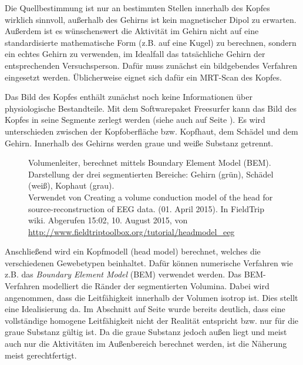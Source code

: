 \documentclass[doc,a4paper,12pt]{apa6}
\makeatletter
\DeclareRobustCommand*{\nameref}[1]{%
      \glqq{\myorg@nameref{#1}}\grqq%
    }%
\makeatother
\begin{document}
Die Quellbestimmung ist nur an bestimmten Stellen innerhalb des Kopfes wirklich sinnvoll, außerhalb des Gehirns ist kein magnetischer Dipol zu erwarten. Außerdem ist es wünschenswert die Aktivität im Gehirn nicht auf eine standardisierte mathematische Form (z.B. auf eine Kugel) zu berechnen, sondern ein echtes Gehirn zu verwenden, im Idealfall das tatsächliche Gehirn der entsprechenden Versuchsperson. Dafür muss zunächst ein bildgebendes Verfahren eingesetzt werden. Üblicherweise eignet sich dafür ein MRT-Scan des Kopfes.

Das Bild des Kopfes enthält zunächst noch keine Informationen über physiologische Bestandteile. Mit dem Softwarepaket Freesurfer kann das Bild des Kopfes in seine Segmente zerlegt werden (siehe auch \nameref{sec:head-struct} auf Seite \pageref{sec:head-struct}). Es wird unterschieden zwischen der Kopfoberfläche bzw. Kopfhaut, dem Schädel und dem Gehirn. Innerhalb des Gehirns werden graue und weiße Substanz getrennt.

\begin{figure}[t]
  \centering
  \vspace*{3mm}
  \caption[Volumenleiter, berechnet mittels Boundary Element Model (BEM)]{Volumenleiter, berechnet mittels Boundary Element Model (BEM). Darstellung der drei segmentierten Bereiche: Gehirn (grün), Schädel (weiß), Kophaut (grau).\\ Verwendet von \glqq Creating a volume conduction model of the head for source-reconstruction of EEG data\grqq . (01. April 2015). In FieldTrip wiki. Abgerufen 15:02, 10. August 2015, von \url{http://www.fieldtriptoolbox.org/tutorial/headmodel_eeg}}
  \label{img:bem}
\end{figure}

Anschließend wird ein Kopfmodell (head model) berechnet, welches die verschiedenen Gewebetypen beinhaltet. Dafür können numerische Verfahren wie z.B. das \emph{Boundary Element Model} (BEM) verwendet werden. Das BEM-Verfahren modelliert die Ränder der segmentierten Volumina. Dabei wird angenommen, dass die Leitfähigkeit innerhalb der Volumen isotrop ist. Dies stellt eine Idealisierung da. Im Abschnitt \nameref{sec:head-struct} auf Seite \pageref{sec:head-struct} wurde bereits deutlich, dass eine vollständige homogene Leitfähigkeit nicht der Realität entspricht bzw. nur für die graue Substanz gültig ist. Da die graue Substanz jedoch außen liegt und meist auch nur die Aktivitäten im Außenbereich berechnet werden, ist die Näherung meist gerechtfertigt.
\end{document}
